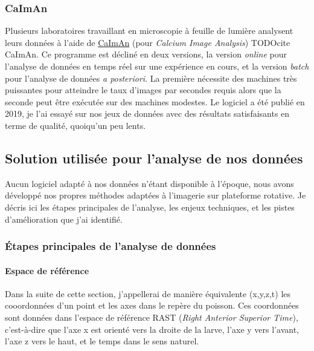 \subsubsection{CaImAn}

Plusieurs laboratoires travaillant en microscopie à feuille de lumière analysent leurs données à l'aide de \href{https://github.com/flatironinstitute/CaImAn}{CaImAn} (pour \emph{Calcium Image Analysis}) TODOcite CaImAn. Ce programme est décliné en deux versions, la version \emph{online} pour l'analyse de données en temps réel sur une expérience en cours, et la version \emph{batch} pour l'analyse de données \emph{a posteriori}. La première nécessite des machines très puissantes pour atteindre le taux d'images par secondes requis alors que la seconde peut être exécutée sur des machines modestes. Le logiciel a été publié en 2019, je l'ai essayé sur nos jeux de données avec des résultats satisfaisants en terme de qualité, quoiqu'un peu lents.

\subsection{Solution utilisée pour l'analyse de nos données}


Aucun logiciel adapté à nos données n'étant disponible à l'époque, nous avons développé nos propres méthodes adaptées à l'imagerie sur plateforme rotative. Je décris ici les étapes principales de l'analyse, les enjeux techniques, et les pistes d'amélioration que j'ai identifié.

\subsubsection{Étapes principales de l'analyse de données}

\paragraph{Espace de référence}

Dans la suite de cette section, j'appellerai de manière équivalente (x,y,z,t) les cooordonnées d'un point et les axes dans le repère du poisson. Ces coordonnées sont données dans l'espace de référence RAST (\emph{Right Anterior Superior Time}), c'est-à-dire que l'axe x est orienté vers la droite de la larve, l'axe y vers l'avant, l'axe z vers le haut, et le temps dans le sens naturel.

